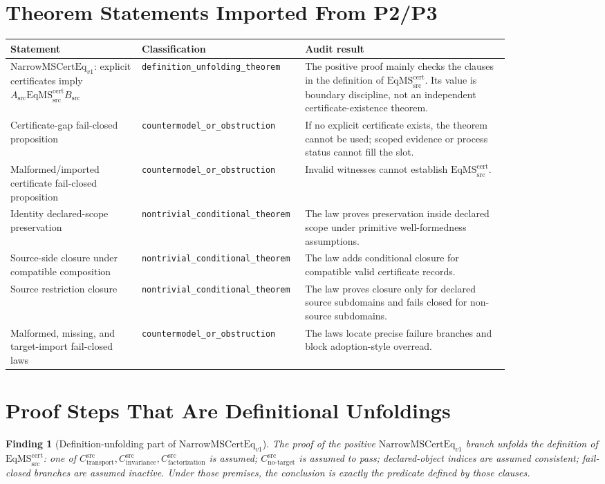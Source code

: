 \documentclass[11pt]{article}
\newcommand{\EqMScert}{\mathrm{EqMS}^{\mathrm{cert}}_{\mathrm{src}}}
\newcommand{\NarrowMSCertEq}{\mathrm{NarrowMSCertEq}_{v1}}
\newcommand{\CTr}{C_{\mathrm{transport}}^{\mathrm{src}}}
\newcommand{\CInv}{C_{\mathrm{invariance}}^{\mathrm{src}}}
\newcommand{\CFact}{C_{\mathrm{factorization}}^{\mathrm{src}}}
\newcommand{\CNTI}{C_{\mathrm{no\text{-}target}}^{\mathrm{src}}}
\newtheorem{finding}{Finding}
\begin{document}
\section{Theorem Statements Imported From P2/P3}

\begin{longtable}{p{0.25\linewidth}p{0.20\linewidth}p{0.39\linewidth}}
\toprule
Statement & Classification & Audit result \\
\midrule
\(\NarrowMSCertEq\): explicit certificates imply \(A_{\mathrm{src}}
\EqMScert B_{\mathrm{src}}\) & \texttt{definition\_unfolding\_theorem} &
The positive proof mainly checks the clauses in the definition of
\(\EqMScert\). Its value is boundary discipline, not an independent
certificate-existence theorem. \\
Certificate-gap fail-closed proposition & \texttt{countermodel\_or\_obstruction} &
If no explicit certificate exists, the theorem cannot be used; scoped evidence
or process status cannot fill the slot. \\
Malformed/imported certificate fail-closed proposition &
\texttt{countermodel\_or\_obstruction} &
Invalid witnesses cannot establish \(\EqMScert\). \\
Identity declared-scope preservation & \texttt{nontrivial\_conditional\_theorem} &
The law proves preservation inside declared scope under primitive
well-formedness assumptions. \\
Source-side closure under compatible composition &
\texttt{nontrivial\_conditional\_theorem} &
The law adds conditional closure for compatible valid certificate records. \\
Source restriction closure & \texttt{nontrivial\_conditional\_theorem} &
The law proves closure only for declared source subdomains and fails closed for
non-source subdomains. \\
Malformed, missing, and target-import fail-closed laws &
\texttt{countermodel\_or\_obstruction} &
The laws locate precise failure branches and block adoption-style overread. \\
\bottomrule
\end{longtable}

\section{Proof Steps That Are Definitional Unfoldings}

\begin{finding}[Definition-unfolding part of \(\NarrowMSCertEq\)]
The proof of the positive \(\NarrowMSCertEq\) branch unfolds the definition of
\(\EqMScert\): one of \(\CTr,\CInv,\CFact\) is assumed; \(\CNTI\) is assumed
to pass; declared-object indices are assumed consistent; fail-closed branches
are assumed inactive. Under those premises, the conclusion is exactly the
predicate defined by those clauses.
\end{finding}
\end{document}
